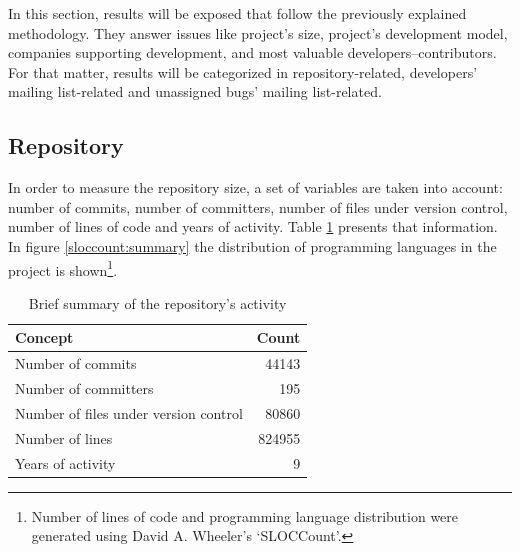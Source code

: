 In this section, results will be exposed that follow the previously explained methodology. They answer issues like project's size, project's development model, companies supporting development, and most valuable developers--contributors. For that matter, results will be categorized in repository-related, developers' mailing list-related and unassigned bugs' mailing list-related.    

\subsection{Repository}

In order to measure the repository size, a set of variables are taken into account: number of commits, number of committers, number of files under version control, number of lines of code and years of activity. Table \ref{repo:summary} presents that information. In figure \ref{sloccount:summary} the distribution of programming languages in the project is shown\footnote{Number of lines of code and programming language distribution were generated using David A. Wheeler's `SLOCCount'.}.	

\begin{table}[ht]
\begin{center}
\begin{tabular}{lr}
  \hline
 Concept & Count \\ 
  \hline
Number of commits & 44143 \\ 
Number of committers & 195 \\
Number of files under version control & 80860\\
Number of lines & 824955\\
Years of activity & 9\\
   \hline
\end{tabular}
\caption{Brief summary of the repository's activity}
\label{repo:summary}
\end{center}
\end{table}

